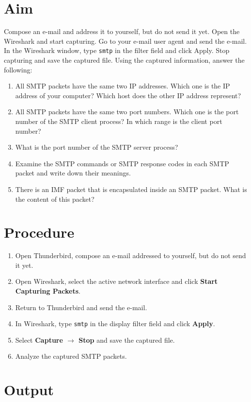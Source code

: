 \documentclass[12pt, a4paper]{report}
\begin{document}
\section*{Aim}
Compose an e-mail and address it to yourself, but do not send it yet. Open the Wireshark and start capturing. Go to your e-mail user agent and send the e-mail. In the Wireshark window, type \texttt{smtp} in the filter field and click Apply. Stop capturing and save the captured file. Using the captured information, answer the following:
\begin{enumerate}
	\itemsep 0em 
	\item[(a)] All SMTP packets have the same two IP addresses. Which one is the IP address of your computer? Which host does the other IP address represent?
	\item[(b)] All SMTP packets have the same two port numbers. Which one is the port number of the SMTP client process? In which range is the client port number?
	\item[(c)] What is the port number of the SMTP server process?
	\item[(d)] Examine the SMTP commands or SMTP response codes in each SMTP packet and write down their meanings.
	\item[(e)] There is an IMF packet that is encapsulated inside an SMTP packet. What is the content of this packet?
\end{enumerate}


\section*{Procedure}
\begin{enumerate}
	\itemsep 0em 
	\item Open Thunderbird, compose an e-mail addressed to yourself, but do not send it yet.
	\item Open Wireshark, select the active network interface and click \textbf{Start Capturing Packets}.
	\item Return to Thunderbird and send the e-mail.
	\item In Wireshark, type \texttt{smtp} in the display filter field and click \textbf{Apply}.
	\item Select \textbf{Capture $\rightarrow$ Stop} and save the captured file.
	\item Analyze the captured SMTP packets.
\end{enumerate}


\section*{Output}
\end{document}
